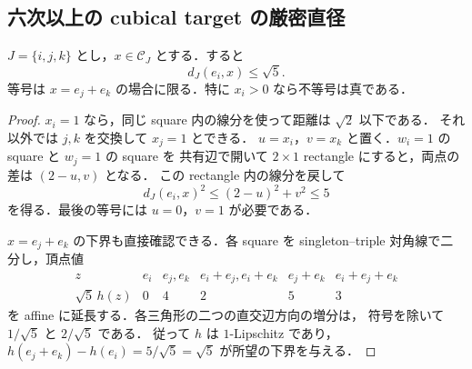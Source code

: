 \subsection{六次以上の cubical target の厳密直径}

\begin{lemma}
\label{topo:corner-singleton-radius}
$J=\{i,j,k\}$ とし，$x\in\mathcal C_J$ とする．すると
\[
 d_J(e_i,x)\le\sqrt5.
\]
等号は $x=e_j+e_k$ の場合に限る．特に $x_i>0$ なら不等号は真である．
\end{lemma}
\begin{proof}
$x_i=1$ なら，同じ square 内の線分を使って距離は $\sqrt2$ 以下である．
それ以外では $j,k$ を交換して $x_j=1$ とできる．
$u=x_i$，$v=x_k$ と置く．$w_i=1$ の square と $w_j=1$ の square を
共有辺で開いて $2\times1$ rectangle にすると，両点の差は $(2-u,v)$ となる．
この rectangle 内の線分を戻して
\[
 d_J(e_i,x)^2\le(2-u)^2+v^2\le5
\]
を得る．最後の等号には $u=0$，$v=1$ が必要である．

$x=e_j+e_k$ の下界も直接確認できる．各 square を singleton--triple
対角線で二分し，頂点値
\[
\begin{array}{c|ccccc}
z&e_i&e_j,e_k&e_i+e_j,e_i+e_k&e_j+e_k&e_i+e_j+e_k\\\hline
\sqrt5\,h(z)&0&4&2&5&3
\end{array}
\]
を affine に延長する．各三角形の二つの直交辺方向の増分は，
符号を除いて $1/\sqrt5$ と $2/\sqrt5$ である．
従って $h$ は $1$-Lipschitz であり，
$h(e_j+e_k)-h(e_i)=5/\sqrt5=\sqrt5$ が所望の下界を与える．
\end{proof}

